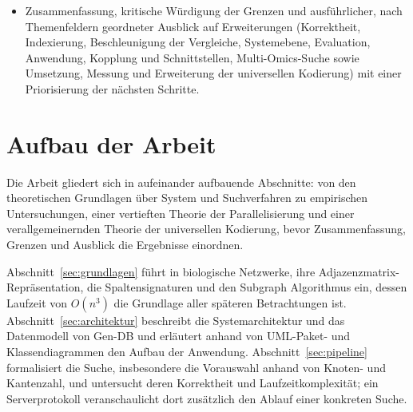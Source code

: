 \documentclass[a4paper,12pt, twoside]{report}
\theoremstyle{definition}
\begin{document}
\begin{itemize}
\begin{itemize}
	\item neun Hypothesen H1 bis H9 mit Herleitung aus den Sätzen und mit Kriterien, an denen sie scheitern können (Tabelle~\ref{tab:ucx_hypothesen});
	\item ein Versuchsaufbau mit $20.000$ Zufallsnetzwerken, einem Anfragegitter aus $56$ Anfragen und eingebetteten Netzwerken mit bekannter Lösung als Ground Truth (identisch, kohärent, nur unabhängig eingebettet);
	\item sieben Teilexperimente: differenzielle Korrektheitsprüfung von Kern und Index, Mikro-Benchmark der Einzelvergleiche, Indexsuche im Speicher mit Anpassung an die Trefferlast und Exponent in $N$, Ende-zu-Ende-Suche mit Phasenzerlegung, Worker-Skalierung, Chunk-Größe und Datenbankgröße mit Speicherbedarf und Einfügezeit des Index;
	\item die Auswertung mit geometrischem Mittel der Speedups und Bootstrap-Intervall, Konfidenzintervallen, linearen Anpassungen und Exponenten sowie die Grenzen der Untersuchung.
\end{itemize}
	\item Zusammenfassung, kritische Würdigung der Grenzen und ausführlicher, nach Themenfeldern geordneter Ausblick auf Erweiterungen (Korrektheit, Indexierung, Beschleunigung der Vergleiche, Systemebene, Evaluation, Anwendung, Kopplung und Schnittstellen, Multi-Omics-Suche sowie Umsetzung, Messung und Erweiterung der universellen Kodierung) mit einer Priorisierung der nächsten Schritte.
\end{itemize}

\section{Aufbau der Arbeit}

Die Arbeit gliedert sich in aufeinander aufbauende Abschnitte: von den theoretischen Grundlagen über System und Suchverfahren zu empirischen Untersuchungen, einer vertieften Theorie der Parallelisierung und einer verallgemeinernden Theorie der universellen Kodierung, bevor Zusammenfassung, Grenzen und Ausblick die Ergebnisse einordnen.

Abschnitt~\ref{sec:grundlagen} führt in biologische Netzwerke, ihre Adjazenzmatrix-Repräsentation, die Spaltensignaturen und den Subgraph Algorithmus ein, dessen Laufzeit von $O(n^3)$ die Grundlage aller späteren Betrachtungen ist. Abschnitt~\ref{sec:architektur} beschreibt die Systemarchitektur und das Datenmodell von Gen-DB und erläutert anhand von UML-Paket- und Klassendiagrammen den Aufbau der Anwendung. Abschnitt~\ref{sec:pipeline} formalisiert die Suche, insbesondere die Vorauswahl anhand von Knoten- und Kantenzahl, und untersucht deren Korrektheit und Laufzeitkomplexität; ein Serverprotokoll veranschaulicht dort zusätzlich den Ablauf einer konkreten Suche.
\end{document}
